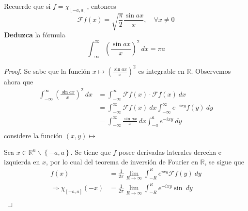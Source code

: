 \documentclass[12pt]{report}
\theoremstyle{largebreak}
\newcommand{\fou}[1]{\ensuremath{\mathcal{F}#1}}
\begin{document}
    \begin{excer}
        Recuerde que si $f=\chi_{[-a,a]}$, entonces
        \begin{equation*}
            \fou{f}(x)=\sqrt{\frac{\pi}{2}}\frac{\sin ax}{x},\quad\forall x\neq0
        \end{equation*}
        \textbf{Deduzca} la fórmula
        \begin{equation*}
            \int_{ -\infty}^{\infty}\left(\frac{\sin ax}{x} \right)^2\:dx=\pi a
        \end{equation*}
    \end{excer}

    \begin{proof}
        Se sabe que la función $x\mapsto\left(\frac{\sin ax}{x}\right)^2$ es integrable en $\mathbb{R}$. Observemos ahora que
        \begin{equation*}
            \begin{split}
                \int_{-\infty}^{\infty}\left(\frac{\sin ax}{x}\right)^2\:dx&=\int_{-\infty}^{\infty}\fou{f}(x)\cdot\fou{f}(x)\:dx\\
                &=\int_{-\infty}^{\infty}\fou{f}(x)\:dx\int_{-\infty}^\infty e^{ -ixy}f(y)\:dy\\
                &=\int_{-\infty}^{\infty}\frac{\sin ax}{x}\:dx\int_{-a}^a e^{ -ixy}\:dy\\
            \end{split}
        \end{equation*}
        considere la función $(x,y)\mapsto $

        Sea $x\in\mathbb{R}^n\backslash\left\{-a,a\right\}$. Se tiene que $f$ posee derivadas laterales derecha e izquierda en $x$, por lo cual del teorema de inversión de Fourier en $\mathbb{R}$, se sigue que
        \begin{equation*}
            \begin{split}
                f(x)&=\frac{1}{2\pi}\lim_{ R\rightarrow\infty}\int_{-R}^R e^{ ixy}\fou{f}(y)\:dy\\
                \Rightarrow\chi_{[-a,a]}(-x)&=\frac{1}{2\pi}\lim_{ R\rightarrow\infty}\int_{-R}^R e^{-ixy}\sin \:dy\\
            \end{split}
        \end{equation*}
    \end{proof}
\end{document}
